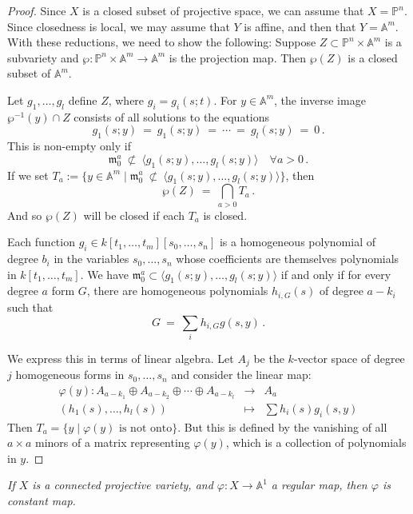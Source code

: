 \documentclass[12pt]{amsart}
\begin{document}
\begin{proof}
Since $X$ is a closed subset of projective space, we can assume that
$X={\mathbb P}^n$.
Since closedness is local, we may assume that $Y$ is affine, and then that
$Y={\mathbb A}^m$.
With these reductions, we need to show the following:
Suppose $Z\subset{\mathbb P}^n\times{\mathbb A}^m$ is a subvariety and
$\wp\colon{\mathbb P}^n\times{\mathbb A}^m\to{\mathbb A}^m$ is the
projection map.
Then $\wp(Z)$ is a closed subset of ${\mathbb A}^m$.

Let $g_1,\ldots,g_l$ define $Z$, where $g_i=g_i(s;t)$.
For $y\in {\mathbb A}^m$, the inverse image $\wp^{-1}(y)\cap Z$ consists of
all solutions to the equations
$$
  g_1(s;y)\ =\ g_1(s;y)\ =\ \cdots\ =\ g_l(s;y)\ =\ 0\,.
$$
This is non-empty only if 
$$
  {\mathfrak m}_0^a\ \not\subset\ 
   \langle g_1(s;y),\ldots,g_l(s;y)\rangle\quad
   \forall a > 0\,.
$$
If we set $T_a:=\{y\in{\mathbb A}^m\mid {\mathfrak m}_0^a\ \not\subset\ 
   \langle g_1(s;y),\ldots,g_l(s;y)\rangle\}$, then 
$$
  \wp(Z)\ =\ \bigcap_{a>0} T_a\,.
$$
And so $\wp(Z)$ will be closed if each $T_a$ is closed.

Each function $g_i\in k[t_1,\ldots,t_m][s_0,\ldots,s_n]$ is a homogeneous
polynomial of degree $b_i$ in the variables $s_0,\ldots,s_n$ whose
coefficients are themselves polynomials in $k[t_1,\ldots,t_m]$.
We have ${\mathfrak m}_0^a\subset\langle g_1(s;y),\ldots,g_l(s;y)\rangle$
if and only if for every degree $a$ form $G$, there are homogeneous
polynomials $h_{i,G}(s)$ of degree $a-k_i$ such that 
$$
  G\ =\ \sum_i h_{i,G}g(s,y)\,.
$$

We express this in terms of linear algebra.
Let $A_j$ be the $k$-vector space of degree $j$ homogeneous forms in
$s_0,\ldots,s_n$ and consider the linear map:
\begin{eqnarray*}
\varphi(y)\colon A_{a-k_1}\oplus A_{a-k_2}\oplus\cdots\oplus A_{a-k_l}
       &\longrightarrow& A_a\\
(h_1(s),\ldots,h_l(s))&\longmapsto& \sum h_i(s) g_i(s,y)
\end{eqnarray*}
Then $T_a=\{y\mid \varphi(y)\mbox{ is not onto}\}$.
But this is defined by the vanishing of all $a\times a$ minors of a matrix
representing $\varphi(y)$, which is a collection of polynomials in $y$.
\end{proof}

{\it
If $X$ is a connected projective variety, and 
$\varphi\colon X\to {\mathbb A}^1$ a regular map, then $\varphi$ is
constant map. 
}\medskip
\end{document}
